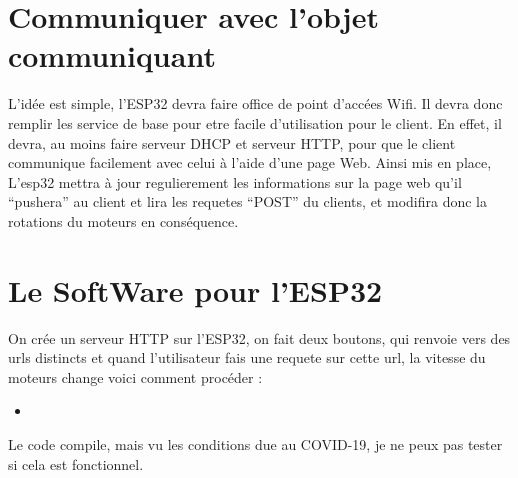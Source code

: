 \documentclass[10pt,a4paper]{article}
\newcommand{\insertcode}[2]{\begin{itemize}\item[]\end{itemize}}
\begin{document}
 
 
 
\section{Communiquer avec l'objet communiquant}


L'idée est simple, l'ESP32 devra faire office de point d'accées Wifi. Il devra donc remplir les service de base pour etre facile d'utilisation pour le client. En effet, il devra, au moins faire serveur DHCP et serveur HTTP, pour que le client communique facilement avec celui à l'aide d'une page Web. Ainsi mis en place, L'esp32 mettra à jour regulierement les informations sur la page web qu'il ``pushera'' au client et lira les requetes ``POST'' du clients, et modifira donc la rotations du moteurs en conséquence. 
 
 \section{Le SoftWare pour l'ESP32}
 
On crée un serveur HTTP sur l'ESP32, on fait deux boutons, qui renvoie vers des urls distincts et quand l'utilisateur fais une requete sur cette url, la vitesse du moteurs change voici comment procéder :\newpage
\insertcode{code/code.ino}{Mon Code}
Le code compile, mais vu les conditions due au COVID-19, je ne peux pas tester si cela est fonctionnel. 
\end{document}
